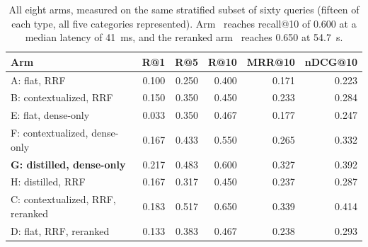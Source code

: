 \begin{table}[t]
\centering
\small
\caption{All eight arms, measured on the same stratified subset of sixty queries (fifteen of each type, all five categories represented). Arm~ reaches recall@10 of 0.600 at a median latency of 41~ms, and the reranked arm~ reaches 0.650 at 54.7~s.}
\label{tab:rerank-subset}
\begin{tabular}{lrrrrr}
\toprule
Arm & R@1 & R@5 & R@10 & MRR@10 & nDCG@10 \\
\midrule
A: flat, RRF & 0.100 & 0.250 & 0.400 & 0.171 & 0.223 \\
B: contextualized, RRF & 0.150 & 0.350 & 0.450 & 0.233 & 0.284 \\
E: flat, dense-only & 0.033 & 0.350 & 0.467 & 0.177 & 0.247 \\
F: contextualized, dense-only & 0.167 & 0.433 & 0.550 & 0.265 & 0.332 \\
\textbf{G: distilled, dense-only} & 0.217 & 0.483 & 0.600 & 0.327 & 0.392 \\
H: distilled, RRF & 0.167 & 0.317 & 0.450 & 0.237 & 0.287 \\
C: contextualized, RRF, reranked & 0.183 & 0.517 & 0.650 & 0.339 & 0.414 \\
D: flat, RRF, reranked & 0.133 & 0.383 & 0.467 & 0.238 & 0.293 \\
\bottomrule
\end{tabular}
\end{table}
